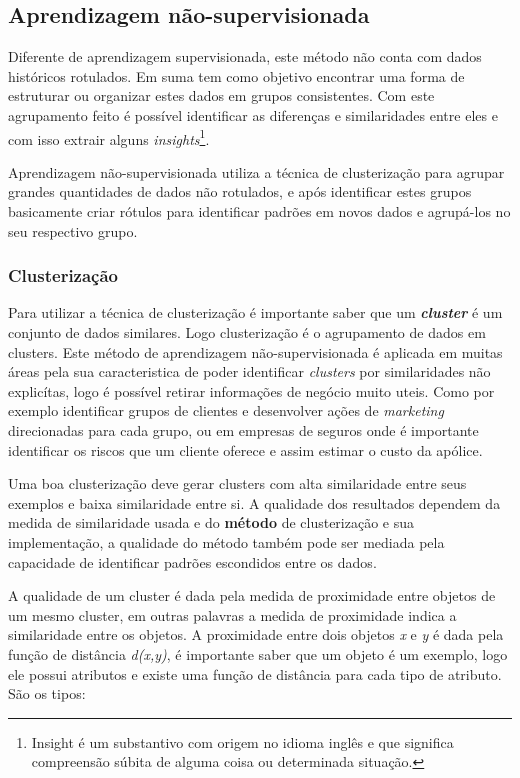\subsection{Aprendizagem não-supervisionada}
\label{subsec:unsupervised-learning}

Diferente de aprendizagem supervisionada, este método não conta com dados históricos rotulados. Em suma tem como objetivo encontrar
uma forma de estruturar ou organizar estes dados em grupos consistentes. Com este agrupamento feito é possível identificar 
as diferenças e similaridades entre eles e com isso extrair alguns 
\textit{insights}\footnote{ \cite{insight} Insight é um substantivo com origem no idioma inglês e que significa 
compreensão súbita de alguma coisa ou determinada situação.}.

Aprendizagem não-supervisionada utiliza a técnica de clusterização para agrupar grandes quantidades de dados não rotulados,
e após identificar estes grupos basicamente criar rótulos para identificar padrões em novos dados e agrupá-los no seu respectivo
grupo.

\subsubsection{Clusterização}
\label{subsec:clustering}
Para utilizar a técnica de clusterização é importante saber que um \textbf{\textit{cluster}} é um conjunto de dados similares.
Logo clusterização é o agrupamento de dados em clusters. Este método de aprendizagem não-supervisionada é aplicada em muitas áreas
pela sua caracteristica de poder identificar \textit{clusters} por similaridades não explicítas, logo é possível retirar informações
de negócio muito uteis. Como por exemplo identificar grupos de clientes e desenvolver ações de \textit{marketing} direcionadas
para cada grupo, ou em empresas de seguros onde é importante identificar os riscos que um cliente oferece e assim estimar o
custo da apólice.

Uma boa clusterização deve gerar clusters com alta similaridade entre seus exemplos e baixa similaridade entre si. A qualidade 
dos resultados dependem da medida de similaridade usada e do \textbf{método} de clusterização e sua implementação,
a qualidade do método também pode ser mediada pela capacidade de identificar padrões escondidos entre os dados.

A qualidade de um cluster é dada pela medida de proximidade entre objetos de um mesmo cluster, em outras palavras a medida de 
proximidade indica a similaridade entre os objetos. A proximidade entre dois objetos \textit{x} e \textit{y} é dada pela função
de distância \textit{d(x,y)}, é importante saber que um objeto é um exemplo, logo ele possui atributos e existe uma função de 
distância para cada tipo de atributo. São os tipos:

